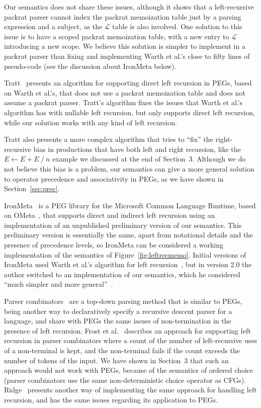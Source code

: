 Our semantics does not share these
issues, although it shows that a left-recursive packrat parser cannot
index the packrat memoization table just by a parsing expression and a
subject, as the $\mathcal{L}$ table is also involved. One solution to
this issue is to have a scoped packrat memoization table, with a new
entry to $\mathcal{L}$ introducing a new scope. We believe this
solution is simpler to implement in a packrat parser than fixing and implementing
Warth et al.'s close to fifty lines of pseudo-code (see the discussion about IronMeta below).

Tratt~\cite{tratt:left} presents an algorithm for supporting direct
left recursion in PEGs, based on Warth et al.'s, that does not use a
packrat memoization table and does not assume a packrat parser. 
Tratt's algorithm fixes the issues that Warth et al.'s algorithm has with nullable left
recursion, but only supports direct left recursion, while our solution works
with any kind of left recursion.

Tratt also presents a more complex algorithm that tries to ``fix'' the right-recursive bias in
productions that have both left and right recursion, like the $E
\leftarrow E+E \ /\ n$ example we discussed at the end of
Section~3. Although we do not believe this bias is a problem, our semantics
can give a more general solution to operator precedence and associativity in PEGs, 
as we have shown in Section~\ref{sec:prec}.

IronMeta~\cite{ironmeta} is a PEG library for the Microsoft Common Language Runtime,
based on OMeta~\cite{warth:ometa}, that supports direct and indirect
left recursion using an implementation of an unpublished preliminary
version of our semantics. This preliminary version is essentially the same, apart
from notational details and the presence of precedence levels, so IronMeta can be considered a working
implementation of the semantics of Figure~\ref{fig:leftrecmemo}. Initial versions of IronMeta used
Warth et al.'s algorithm for left recursion~\cite{warth:left}, but in
version 2.0 the author switched to an implementation of our semantics,
which he considered ``much simpler and more general''~\cite{ironmeta}.

Parser combinators~\cite{hutton:comb} are a top-down parsing method
that is similar to PEGs, being another way to declaratively specify a
recursive descent parser for a language, and share with PEGs the same issues of
non-termination in the presence of left recursion. Frost et
al.~\cite{frost:left} describes an approach for supporting left
recursion in parser combinators where a count of the number of
left-recursive uses of a non-terminal is kept, and the non-terminal
fails if the count exceeds the number of tokens of the input. We have
shown in Section~3 that such an approach would not work with PEGs,
because of the semantics of ordered choice (parser combinators use
the same non-deterministic choice operator as
CFGs). Ridge~\cite{ridge:allcfg} presents another way of implementing
the same approach for handling left recursion, and has the same issues
regarding its application to PEGs.

